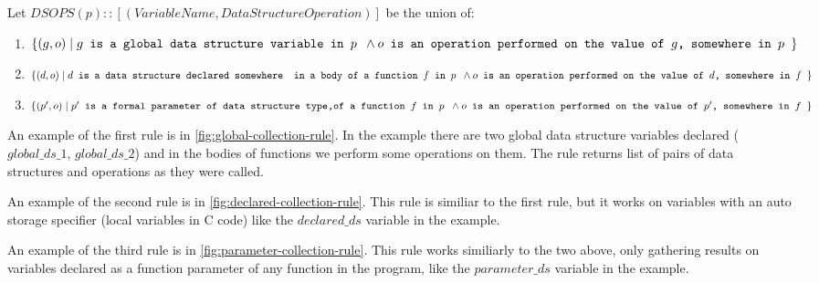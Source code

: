 \documentclass[a4paper,11pt]{article}
\begin{document}
		Let $DSOPS(p) :: [(\mathit{VariableName}, \mathit{DataStructureOperation})]$ be the union of:
		\begin{enumerate}

			\item \label{it:global} $\{(g, o)\; |\; g \texttt{ is a global data structure variable in $p$ }
				\wedge \\ o \texttt{ is an operation performed on the value of $g$, somewhere in $p$ } \}$

			\item \label{it:auto} $\{(d, o)\; |\; d \texttt{ is a data structure declared somewhere } \\
				\texttt{ in a body of a function $f$ in $p$ } \wedge \\ o \texttt{ is an operation
				performed on the value of $d$, somewhere in $f$ } \}$

			\item \label{it:param} $\{(p', o)\; |\; p' \texttt{ is a formal parameter of data structure type,}
				\\ \texttt{of a function $f$ in $p$ } \wedge \\ o \texttt{ is an operation performed on the value of 
				$p'$, somewhere in $f$ } \}$

		\end{enumerate}

		An example of the first rule is in \autoref{fig:global-collection-rule}. In the example there are two global data structure variables declared ($global\_ds\_1$, $global\_ds\_2$) and in the bodies of functions we perform some operations on them. The rule returns list of pairs of data structures and operations as they were called.

		An example of the second rule is in \autoref{fig:declared-collection-rule}. This rule is similiar to the first rule, but it works on variables with an auto storage specifier (local variables in C code) like the $declared\_ds$ variable in the example.

		An example of the third rule is in \autoref{fig:parameter-collection-rule}. This rule works similiarly to the two above, only gathering results on variables declared as a function parameter of any function in the program, like the $parameter\_ds$ variable in the example.
\end{document}

